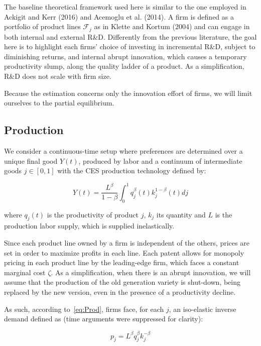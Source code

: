 \documentclass[letterpaper,12pt]{article}
\theoremstyle{definition}
\begin{document}
The baseline theoretical framework used here is similar to the one employed in Ackigit and Kerr (2016) and Acemoglu et al. (2014). A firm is defined as a portfolio of product lines $\mathscr{F}_j$ as in Klette and Kortum (2004) and can engage in both internal and external R\&D. Differently from the previous literature, the goal here is to highlight each firms' choice of investing in incremental R\&D, subject to diminishing returns, and internal abrupt innovation, which causes a temporary productivity slump, along the quality ladder of a product. As a simplification, R\&D does not scale with firm size.

Because the estimation concerns only the innovation effort of firms, we will limit ourselves to the partial equilibrium.

\subsection{Production}

We consider a continuous-time setup where preferences are determined over a unique final good $Y(t)$, produced by labor and a continuum of intermediate goods $j \in [0,1]$ with the CES production technology defined by:

\begin{equation} \label{eq:Prod}
Y(t) =  \frac{L^{\beta}}{1 - \beta}\int_0^1 q_j^{\beta}(t)k_j^{1-\beta}(t)dj
\end{equation}

\noindent where $q_j(t)$ is the productivity of product $j$, $k_j$ its quantity and $L$ is the production labor supply, which is supplied inelastically. 

Since each product line owned by a firm is independent of the others, prices are set in order to maximize profits in each line. Each patent allows for monopoly pricing in each product line by the leading-edge firm, which faces a constant marginal cost $\zeta$. As a simplification, when there is an abrupt innovation, we will assume that the production of the old generation variety is shut-down, being replaced by the new version, even in the presence of a productivity decline.

As such, according to~\eqref{eq:Prod}, firms face, for each $j$, an iso-elastic inverse demand defined as (time arguments were suppressed for clarity):

\begin{equation} \label{eq:Price}
p_j =  L^{\beta}q_j^{\beta}k_j^{-\beta}
\end{equation}
\end{document}
